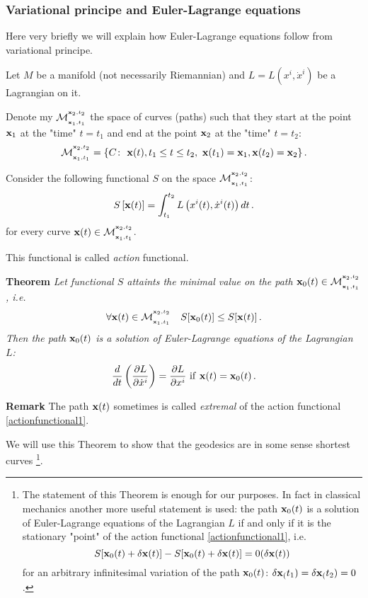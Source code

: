 \documentclass[12pt]{article}
\theoremstyle{theorem}
\numberwithin{equation}{section}
\begin{document}
{\subsubsection {Variational principe and Euler-Lagrange equations }

   Here very briefly we will explain how Euler-Lagrange equations follow from variational principe.

\m
\def\confspace {\M^{^{\x_2,t_2}}_{_{\x_1,t_1}}}

Let $M$ be a manifold (not necessarily Riemannian) and $L=L(x^i,\dot x^i)$ be a Lagrangian on it.

   Denote my ${\cal M}^{^{{\bf x}_2,t_2}}_{_{{\bf x}_1,t_1}}$ the space of curves (paths)
such that they start at the point ${\bf x}_1$ at the "time" $t=t_1$ and end at the
point  ${\bf x}_2$ at the "time" $t=t_2$:
\begin{equation}\label{spacceofpaths}
{\cal M}^{^{{\bf x}_2,t_2}}_{_{{\bf x}_1,t_1}}=\{C\colon\,\, {\bf x}(t), t_1\leq t\leq t_2,\,\,{\bf x}(t_1)={\bf x}_1, {\bf x}(t_2)={\bf x}_2\}\,.
\end{equation}

  Consider the following functional $S$ on the space $\confspace$:
                \begin{equation}\label{actionfunctional1}
  S\left[{\bf x}(t)\right]=\int_{t_1}^{t_2}L\left(x^i(t), \dot x^i(t)\right)dt\,.
                \end{equation}
    for every curve $\x(t)\in \confspace$.

This functional is called {\it action} functional.

{\bf Theorem}  {\it Let functional $S$ attaints the minimal value on the path $\x_0(t)\in\confspace$, i.e.
                             \begin{equation}\label{minimalvalueofthefunctional}
                    \forall \x(t)\in \confspace\quad            S[\x_0(t)]\leq  S[\x(t)]\,.
                             \end{equation}
Then the path ${\bf x}_0(t)$ is a solution of Euler-Lagrange equations of the Lagrangian $L$:
            \begin{equation}\label{minimalfunctionsolution1}
{d\over dt}\left({\partial L\over \partial \dot x^i}\right)={\partial L\over \partial  x^i}\,\,
            {\rm if}\,\, {\bf x}(t)={\bf x}_0(t)\,.
            \end{equation}
 }
 \m


 {\bf Remark} The path ${\bf x}(t)$ sometimes is called {\it extremal} of the action functional
\eqref{actionfunctional1}.

   We will use this Theorem to show that the geodesics are in some sense shortest curves
   \footnote{The statement of this Theorem is enough for our purposes.
  In fact in classical mechanics another more useful statement
  is used:
  the path ${\bf x}_0(t)$ is a solution of Euler-Lagrange equations of the Lagrangian $L$
  if and only if it is the stationary "point" of the action functional  \eqref{actionfunctional1}, i.e.
           \begin{equation}\label{stationarpath}
            S[{\bf x}_0(t)+\delta {\bf x}(t)]-S[{\bf x}_0(t)+\delta {\bf x}(t)]=0(\delta {\bf x}(t))
           \end{equation}
 for an arbitrary infinitesimal variation of the path ${\bf x}_0(t)$:
   $\delta {\bf x}_(t_1)=\delta {\bf x}_(t_2)=0$.}.

}
\end{document}
